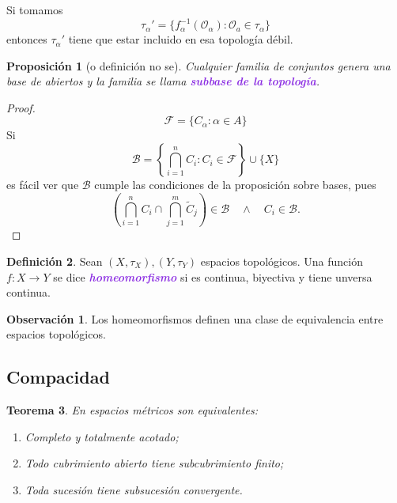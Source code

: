 \documentclass{article}
\newtheorem{theorem}{Teorema}[section]
\newtheorem{proposition}[theorem]{Proposición}
\theoremstyle{definition}
\newtheorem{definition}[theorem]{Definición}
\newtheorem*{obs}{Observación}
\theoremstyle{remark}
\numberwithin{equation}{section}
\newcommand{\B}{\mathcal{B}}
\renewcommand{\O}{\mathcal{O}}
\newcommand{\Fcal}{\mathcal{F}}
\renewcommand{\a}{\alpha}
\renewcommand{\t}{\tau}
\renewcommand{\tilde}{\widetilde}
\newcommand{\br}[1]{\left( #1 \right)}
\newcommand{\set}[1]{\left\{ #1 \right\}}
\newcommand{\wea}[1]{\textcolor{BlueViolet}{\textbf{\emph{#1}}}}
\newcommand{\fecha}[1]{\begin{flushright} \underline{#1} \end{flushright}}
\begin{document}
Si tomamos $$\t_\a' = \{f_\a^{-1}(\O_\a) \colon \O_a \in \t_\a\}$$ entonces $\t_\a'$ tiene que estar incluido en esa topología débil.

\begin{proposition}[o definición no se]
  Cualquier familia de conjuntos genera una base de abiertos y la familia se llama \wea{subbase de la topología}.
\end{proposition}
\begin{proof}
  $$\Fcal = \{C_\a \colon \a \in A\}$$
  Si $$\B = \set{\bigcap_{i=1}^n C_i \colon C_i \in \Fcal} \cup \{X\}$$
  es fácil ver que $\B$ cumple las condiciones de la proposición sobre bases, pues
  \[\br{\bigcap_{i=1}^n C_i \cap \bigcap_{j=1}^m \tilde C_j} \in \B \quad\land\quad C_i \in \B.\]
\end{proof}

\begin{definition}
  Sean $(X,\t_X), (Y,\t_Y)$ espacios topológicos. Una función $f \colon X \to Y$ se dice \wea{homeomorfismo} si es continua, biyectiva y tiene unversa continua.
\end{definition}

\begin{obs}
  Los homeomorfismos definen una clase de equivalencia entre espacios topológicos.
\end{obs}

\newpage
\subsection{Compacidad}

\begin{theorem}
  En espacios métricos son equivalentes:
  \begin{enumerate}[(1)]
    \item Completo y totalmente acotado;
    \item Todo cubrimiento abierto tiene subcubrimiento finito;
    \item Toda sucesión tiene subsucesión convergente.
  \end{enumerate}
\end{theorem}

\end{document}
